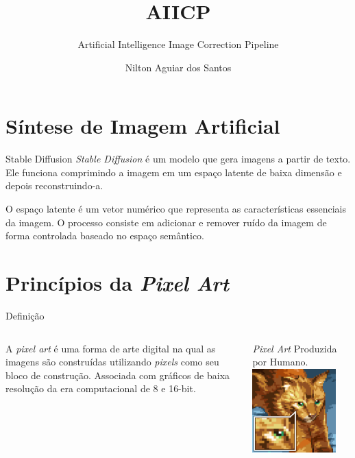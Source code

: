 \documentclass[compress,12pt]{beamer}
\title{AIICP}
\subtitle{Artificial Intelligence Image Correction Pipeline}
\date{}
\author{Nilton Aguiar dos Santos}
\begin{document}
\frame[plain]{\titlepage}

\section{Síntese de Imagem Artificial}

\begin{frame}{Stable Diffusion}
    \textit{Stable Diffusion} é um modelo que gera imagens a partir de texto. Ele funciona comprimindo a imagem em um espaço latente de baixa dimensão e depois reconstruindo-a.
	
    O espaço latente é um vetor numérico que representa as características essenciais da imagem. O processo consiste em adicionar e remover ruído da imagem de forma controlada baseado no espaço semântico.
\end{frame}

\section{Princípios da \textit{Pixel Art}}

\begin{frame}{Definição}
	\begin{columns}
		\begin{column}{0.5\textwidth}
                A \textit{pixel art} é uma forma de arte digital na qual as imagens são construídas utilizando \textit{pixels} como seu bloco de construção. Associada com gráficos de baixa resolução da era computacional de 8 e 16-bit.
		\end{column}
		\begin{column}{0.5\textwidth}  %
			\begin{center}
                {\textit{Pixel Art} Produzida por Humano.} 
				\includegraphics[width=0.85\textwidth]{Images/catImage.png}
			\end{center}
		\end{column}
	\end{columns}
\end{frame}
\end{document}
